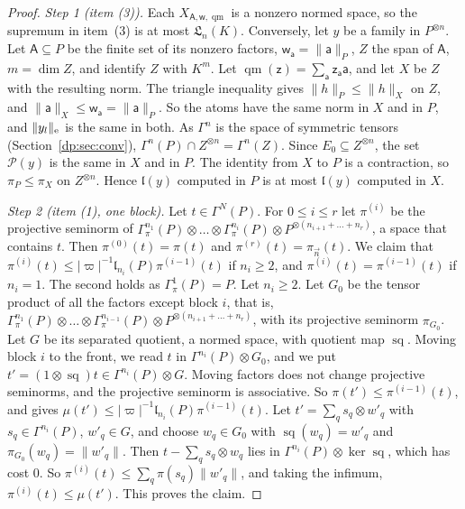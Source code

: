 \documentclass[11pt]{amsart}
\theoremstyle{definition}
\theoremstyle{remark}
\numberwithin{equation}{section}
\newcommand{\abs}[1]{\lvert #1\rvert}
\newcommand{\norm}[1]{\lVert #1\rVert}
\theoremstyle{plain}
\theoremstyle{definition}
\theoremstyle{plain}
\begin{document}
\begin{proof}
\emph{Step 1 (item (3)).} Each $X_{\mathsf A,\mathsf w,\operatorname{qm}}$ is a nonzero normed space, so the supremum in item~(3) is at most $\mathfrak L_n(K)$. Conversely, let $y$ be a family in $P^{\otimes n}$. Let $\mathsf A\subseteq P$ be the finite set of its nonzero factors, $\mathsf w_{\mathsf a}=\norm{\mathsf a}_P$, $Z$ the span of $\mathsf A$, $m=\dim Z$, and identify $Z$ with $K^m$. Let $\operatorname{qm}(\mathsf z)=\sum_{\mathsf a}\mathsf z_{\mathsf a}\mathsf a$, and let $X$ be $Z$ with the resulting norm. The triangle inequality gives $\norm h_P\le\norm h_X$ on $Z$, and $\norm{\mathsf a}_X\le\mathsf w_{\mathsf a}=\norm{\mathsf a}_P$. So the atoms have the same norm in $X$ and in $P$, and $\norm{y_l}_{\rm e}$ is the same in both. As $\Gamma^n$ is the space of symmetric tensors (Section~\ref{dp:sec:conv}), $\Gamma^n(P)\cap Z^{\otimes n}=\Gamma^n(Z)$. Since $E_0\subseteq Z^{\otimes n}$, the set $\mathcal P(y)$ is the same in $X$ and in $P$. The identity from $X$ to $P$ is a contraction, so $\pi_P\le\pi_X$ on $Z^{\otimes n}$. Hence $\mathfrak l(y)$ computed in $P$ is at most $\mathfrak l(y)$ computed in $X$.

\emph{Step 2 (item (1), one block).} Let $t\in\Gamma^N(P)$. For $0\le i\le r$ let $\pi^{(i)}$ be the projective seminorm of $\Gamma^{n_1}_\pi(P)\otimes\dots\otimes\Gamma^{n_i}_\pi(P)\otimes P^{\otimes(n_{i+1}+\dots+n_r)}$, a space that contains $t$. Then $\pi^{(0)}(t)=\pi(t)$ and $\pi^{(r)}(t)=\pi_{\vec n}(t)$. We claim that $\pi^{(i)}(t)\le\abs\varpi^{-1}\mathfrak l_{n_i}(P)\pi^{(i-1)}(t)$ if $n_i\ge2$, and $\pi^{(i)}(t)=\pi^{(i-1)}(t)$ if $n_i=1$. The second holds as $\Gamma^1_\pi(P)=P$. Let $n_i\ge2$. Let $G_0$ be the tensor product of all the factors except block $i$, that is, $\Gamma^{n_1}_\pi(P)\otimes\dots\otimes\Gamma^{n_{i-1}}_\pi(P)\otimes P^{\otimes(n_{i+1}+\dots+n_r)}$, with its projective seminorm $\pi_{G_0}$. Let $G$ be its separated quotient, a normed space, with quotient map $\operatorname{sq}$. Moving block $i$ to the front, we read $t$ in $\Gamma^{n_i}(P)\otimes G_0$, and we put $t'=(1\otimes\operatorname{sq})t\in\Gamma^{n_i}(P)\otimes G$. Moving factors does not change projective seminorms, and the projective seminorm is associative. So $\pi(t')\le\pi^{(i-1)}(t)$, and \cite[Lemma~Q.7(2)]{I} gives $\mu(t')\le\abs\varpi^{-1}\mathfrak l_{n_i}(P)\pi^{(i-1)}(t)$. Let $t'=\sum_qs_q\otimes w'_q$ with $s_q\in\Gamma^{n_i}(P)$, $w'_q\in G$, and choose $w_q\in G_0$ with $\operatorname{sq}(w_q)=w'_q$ and $\pi_{G_0}(w_q)=\norm{w'_q}$. Then $t-\sum_qs_q\otimes w_q$ lies in $\Gamma^{n_i}(P)\otimes\ker\operatorname{sq}$, which has cost $0$. So $\pi^{(i)}(t)\le\sum_q\pi(s_q)\norm{w'_q}$, and taking the infimum, $\pi^{(i)}(t)\le\mu(t')$. This proves the claim.


\end{proof}
\end{document}
